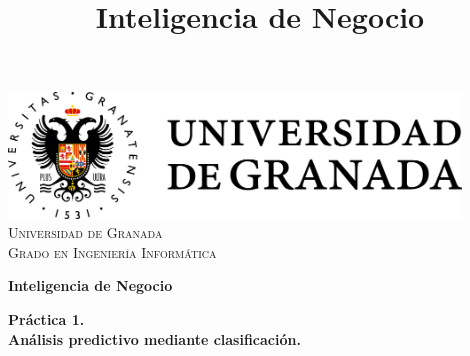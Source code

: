 
\title{Inteligencia de Negocio}



\begin{titlepage}
    

    \begin{center}

        \includegraphics[width=0.9\textwidth]{portada/imagenes/UGR_logo_horizontal.png}\\[1.4cm]

        \textsc{\large Universidad de Granada}\\
        \textsc{\large Grado en Ingeniería Informática}\\[2.5cm]

        \begin{mdframed}[linewidth=2pt, innertopmargin=3ex, innerbottommargin=3ex, leftline=false, rightline=false]
            \begin{center}
                {\bfseries\huge Inteligencia de Negocio}
            \end{center}
        \end{mdframed}

        {\LARGE \bfseries Práctica 1.\\}
        {\LARGE \bfseries Análisis predictivo mediante clasificación.\\}

        \noindent\\[3.5cm]


\end{center}
\end{titlepage}
